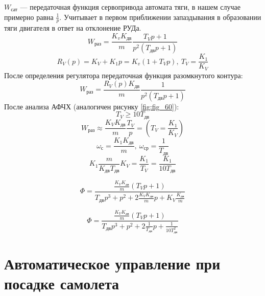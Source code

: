 \documentclass{article}
\begin{document}
$W_\text{сат}$ --- передаточная функция сервопривода автомата тяги, в нашем
случае примерно равна $\frac{1}{p}$.
Учитывает в первом приближении запаздывания в образовании тяги двигателя в
ответ на отклонение РУДа.
\[
    W_\text{раз} = \frac{K_v K_\text{дв}}{m} \frac{T_V p + 1}{p^2(T_\text{дв}p
    +1)}
\]
\[
    R_V(p) = K_V + K_1 p = K_v (1 + T_V p), \ T_V = \frac{K_1}{K_V}
\]
После определения регулятора передаточная функция разомкнутого контура:
\[
    W_\text{раз} = \frac{R_V(p) K_\text{дв}}{m} \frac{1}{p^2(T_\text{дв}p +1)}
\]
После анализа АФЧХ (аналогичен рисунку \ref{fig:fig_60}):
\[
    T_V \ge 10 T_\text{дв}
\]
\[
    W_\text{раз} \approx \frac{K_V K_ \text{дв}}{m}\frac{T_V}{p}  = \left( T_V
    = \frac{K_1}{K_V} \right)
\]
\[
    \omega_\text{с} = \frac{K_1 K_\text{дв}}{m}, \ \omega_\text{ср} =
    \frac{1}{T_\text{дв}}
\]
\[
    K_1 \frac{m}{K_\text{дв} T_\text{дв}} K_V = \frac{K_1}{T_V} = \frac{K_1}{10
    T_\text{дв}}
\]

\[
    \Phi = \frac{\frac{K_V K_\text{дв}}{m}(T_V p + 1)}{T_\text{дв} p^3 + p^2 +
    2 \frac{K_V K_\text{дв}}{m}p + K_V \frac{K_\text{дв}}{m}}
\]

\[
    \Phi = \frac{\frac{K_V K_\text{дв}}{m}(T_V p + 1)}{ T_\text{дв}p^3 + p^2 +
    2 \frac{1}{T_\text{дв}}p + \frac{1}{10 T_\text{дв}^2}}
\]

\section{Автоматическое управление при посадке самолета}
\end{document}
